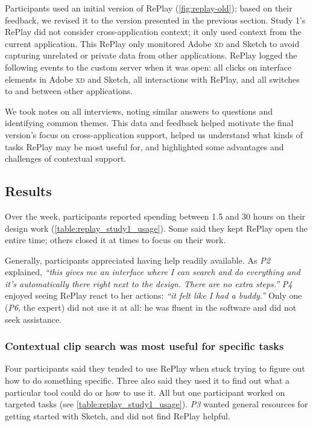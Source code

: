 Participants used an initial version of RePlay (\autoref{fig:replay-old}); based on their feedback, we revised it to the version presented in the previous section. Study 1's RePlay did not consider cross-application context; it only used context from the current application. This RePlay only monitored Adobe \textsc{xd} and Sketch to avoid capturing unrelated or private data from other applications. RePlay logged the following events to the custom server when it was open: all clicks on interface elements in Adobe \textsc{xd} and Sketch, all interactions with RePlay, and all switches to and between other applications.

We took notes on all interviews, noting similar answers to questions and identifying common themes. This data and feedback helped motivate the final version's focus on cross-application support, helped us understand what kinds of tasks RePlay may be most useful for, and highlighted some advantages and challenges of contextual support.

\subsection{Results}
Over the week, participants reported spending between 1.5 and 30 hours on their design work (\autoref{table:replay_study1_usage}). Some said they kept RePlay open the entire time; others closed it at times to focus on their work. 

Generally, participants appreciated having help readily available. As \textit{P2} explained, \textit{``this gives me an interface where I can search and do everything and it's automatically there right next to the design. There are no extra steps.''} \textit{P4} enjoyed seeing RePlay react to her actions: \textit{``it felt like I had a buddy.''} Only one (\textit{P6}, the expert) did not use it at all: he was fluent in the software and did not seek assistance.

\subsubsection{Contextual clip search was most useful for specific tasks}
Four participants said they tended to use RePlay when stuck trying to figure out how to do something specific. Three also said they used it to find out what a particular tool could do or how to use it. All but one participant worked on targeted tasks (see \autoref{table:replay_study1_usage}). \textit{P3} wanted general resources for getting started with Sketch, and did not find RePlay helpful.

